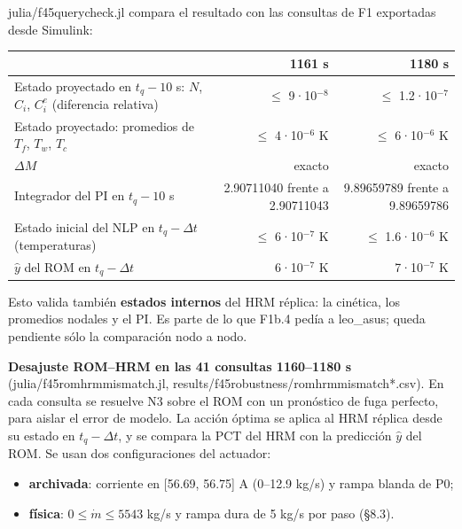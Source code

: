 \documentclass[11pt,a4paper]{article}
\newcommand{\codeus}{\textunderscore\allowbreak}
\newcommand{\code}[1]{{\small\ttfamily\let\_\codeus #1}}
\begin{document}
\code{julia/f45\_query\_check.jl} compara el resultado con las consultas de F1 exportadas desde Simulink:

{\small
\begin{xltabular}{\linewidth}{@{}YRR@{}}
\toprule
\textbf{} & \textbf{1161 s} & \textbf{1180 s} \\
\midrule
\endhead
Estado proyectado en $t_q-10$ s: $N$, $C_i$, $C^e_i$ (diferencia relativa) & $\le$ 9·10$^{-8}$ & $\le$ 1.2·10$^{-7}$ \\
Estado proyectado: promedios de $T_f$, $T_w$, $T_c$ & $\le$ 4·10$^{-6}$ K & $\le$ 6·10$^{-6}$ K \\
$\Delta M$ & exacto & exacto \\
Integrador del PI en $t_q-10$ s & 2.90711040 frente a 2.90711043 & 9.89659789 frente a 9.89659786 \\
Estado inicial del NLP en $t_q-\Delta t$ (temperaturas) & $\le$ 6·10$^{-7}$ K & $\le$ 1.6·10$^{-6}$ K \\
$\hat y$ del ROM en $t_q-\Delta t$ & 6·10$^{-7}$ K & 7·10$^{-7}$ K \\
\bottomrule
\end{xltabular}}

Esto valida también \textbf{estados internos} del HRM réplica: la cinética, los promedios nodales y el PI. Es parte de lo que F1b.4 pedía a leo\_asus; queda pendiente sólo la comparación nodo a nodo.

\textbf{Desajuste ROM–HRM en las 41 consultas 1160–1180 s} (\code{julia/f45\_rom\_hrm\_mismatch.jl}, \code{results/f45\_robustness/rom\_hrm\_mismatch*.csv}). En cada consulta se resuelve N3 sobre el ROM con un pronóstico de fuga perfecto, para aislar el error de modelo. La acción óptima se aplica al HRM réplica desde su estado en $t_q-\Delta t$, y se compara la PCT del HRM con la predicción $\hat y$ del ROM. Se usan dos configuraciones del actuador:

\begin{itemize}
\item \textbf{archivada}: corriente en [56.69, 56.75] A (0–12.9 kg/s) y rampa blanda de P0;
\item \textbf{física}: $0\le\dot m\le5543$ kg/s y rampa dura de 5 kg/s por paso (\S{}8.3).
\end{itemize}
\end{document}
